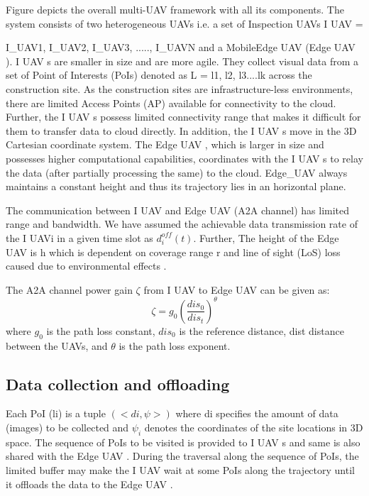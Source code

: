 \documentclass{article}
\begin{document}
\begin{multicols}{2}
Figure  depicts the overall multi-UAV framework with all its components. The system consists of two heterogeneous UAVs i.e. a set of Inspection UAVs I UAV = {I\_UAV1, I\_UAV2, I\_UAV3, ....., I\_UAVN and a MobileEdge UAV (Edge UAV ). I UAV s are smaller in size and are more agile. They collect visual data from a set of Point of Interests (PoIs) denoted as L = {l1, l2, l3....lk} across the construction site. As the construction sites are infrastructure-less environments, there are limited Access Points (AP) available for connectivity to the cloud. Further, the I UAV s possess limited connectivity range that makes it difficult for them to transfer data to cloud directly. In addition, the I UAV s move in the 3D Cartesian coordinate system. The Edge UAV , which is larger in size and possesses higher computational capabilities, coordinates with the I UAV s to relay the data (after partially processing the same) to the cloud. Edge\_UAV always maintains a constant height and thus its trajectory lies in
an horizontal plane.\par
The communication between I UAV and Edge UAV (A2A channel) has limited range and bandwidth. We have assumed the achievable data transmission rate of the I UAVi in a given time slot as $d^{off}_{i}(t)$. Further, The height of the Edge UAV is h which is dependent on coverage range r and line of sight (LoS) loss caused due to environmental effects \cite{al2014optimal}. \par

The A2A channel power gain $\zeta$ from I UAV to
Edge UAV can be given as:
\begin{equation}
    \zeta = g_0(\frac{dis_0}{dis_t})^\theta
\end{equation}
where $g_0$ is the path loss constant, $dis_0$ is the reference distance, dist distance between the UAVs, and $\theta$ is the path loss exponent.

\subsection{Data collection and offloading}

Each PoI (li) is a tuple $(< di, \psi >)$ where di specifies the amount of data (images) to be collected and $\psi_i$ denotes the coordinates of the site locations in 3D space. The sequence of PoIs to be visited is provided to I UAV s and same is also shared with the Edge UAV . During the traversal along the sequence of PoIs, the limited buffer may make the I UAV wait at some PoIs along the trajectory until it offloads the data to the Edge UAV .\par

}
\end{multicols}
\end{document}
